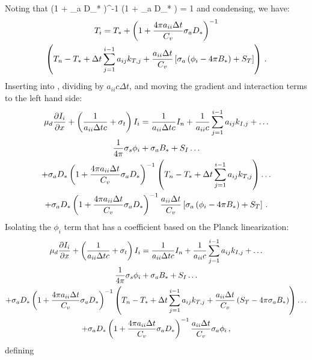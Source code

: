 Noting that 
\benum
\left(1 +  \sigma_a D_*  \right)^{-1} \left(1 +  \sigma_a D_* \right)  = 1 \pec
\eenum
and condensing, we have:
\begin{multline}
T_i = T_* + \left(1 + \frac{4\pi a_{ii} \Delta t}{C_v} \sigma_a D_*  \right)^{-1} \\
\left( T_n - T_* + \Delta t \sum_{j=1}^{i-1}{a_{ij} k_{T,j}} +  \frac{a_{ii} \Delta t }{C_v} \left[ \sigma_a \left( \phi_i - 4\pi   B_* \right) + S_T \right]  \right) \, .
\label{eq:analytic_t_i}
\end{multline}
Inserting  into , dividing by $a_{ii} c \Delta t$, and moving the gradient and interaction terms to the left hand side:
\begin{multline}
\mu_d \frac{\partial I_i}{\partial x} + \left(\frac{1}{a_{ii} \Delta t c} + \sigma_t \right) I_i = \frac{1}{a_{ii} \Delta t c} I_n + \frac{1}{a_{ii} c} \sum_{j=1}^{i-1}{a_{ij} k_{I,j}} + \dots\\
\frac{1}{4\pi}\sigma_{s} \phi_i + \sigma_a B_* + S_I \dots \\
 + \sigma_a D_*\left(1 + \frac{4\pi a_{ii} \Delta t}{C_v} \sigma_a D_*  \right)^{-1} 
\left( T_n - T_* + \Delta t \sum_{j=1}^{i-1}{a_{ij} k_{T,j}} \right) \dots \\
+   \sigma_a D_*\left(1 + \frac{4\pi a_{ii} \Delta t}{C_v} \sigma_a D_*  \right)^{-1}  \frac{a_{ii} \Delta t }{C_v} \left[ \sigma_a \left( \phi_i - 4\pi   B_* \right) + S_T \right]  \, .
\end{multline}
Isolating the $\phi_i$ term that has a coefficient based on the Planck linearization:
\begin{multline}
\mu_d \frac{\partial I_i}{\partial x} + \left(\frac{1}{a_{ii} \Delta t c} + \sigma_t \right) I_i = \frac{1}{a_{ii} \Delta t c} I_n + \frac{1}{a_{ii} c} \sum_{j=1}^{i-1}{a_{ij} k_{I,j}} + \dots\\
\frac{1}{4\pi}\sigma_{s} \phi_i + \sigma_a B_* + S_I \dots \\
 + \sigma_a D_*\left(1 + \frac{4\pi a_{ii} \Delta t}{C_v} \sigma_a D_*  \right)^{-1} 
\left( T_n - T_* + \Delta t \sum_{j=1}^{i-1}{a_{ij} k_{T,j}} +   \frac{a_{ii} \Delta t }{C_v}  \left( S_T -  4\pi  \sigma_a B_*   \right) \right) \dots \\
+   \sigma_a D_*\left(1 + \frac{4\pi a_{ii} \Delta t}{C_v} \sigma_a D_*  \right)^{-1}  \frac{a_{ii} \Delta t }{C_v} \sigma_a  \phi_i  \, ,
\end{multline}
defining 
\benum
